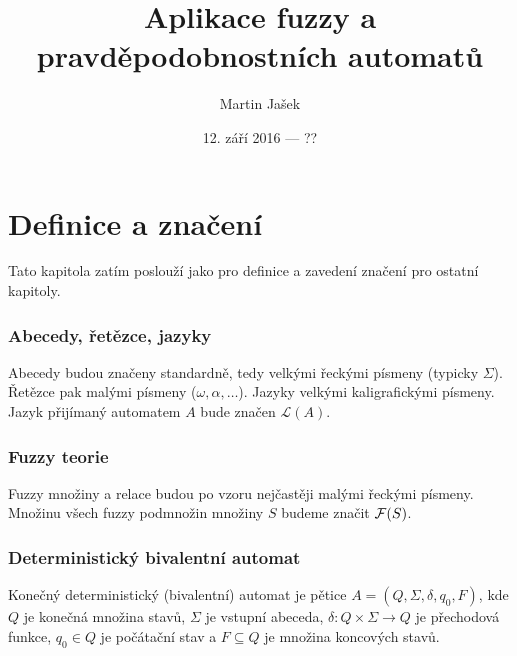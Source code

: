 \documentclass[a4paper,10pt]{article}
\title{Aplikace fuzzy a pravděpodobnostních automatů}
\author{Martin Jašek}
\date{12. září 2016 --- ??}
\begin{document}
\maketitle
\tableofcontents
\newpage

\section{Definice a značení}
Tato kapitola zatím poslouží jako  pro definice a zavedení značení pro ostatní kapitoly.

\subsubsection*{Abecedy, řetězce, jazyky}
Abecedy budou značeny standardně, tedy velkými řeckými písmeny (typicky $\Sigma$). Řetězce pak malými písmeny ($\omega, \alpha, \dots$). Jazyky velkými kaligrafickými písmeny. Jazyk přijímaný automatem $A$ bude značen $\mathcal{L}(A)$.

\subsubsection*{Fuzzy teorie}
Fuzzy množiny a relace budou po vzoru \cite{AstGonMenGar-FuzzAutEpsMovCmpFuzzMeasBtwStrs} nejčastěji malými řeckými písmeny. Množinu všech fuzzy podmnožin množiny $S$ budeme značit $\mathcal{F}(S)$.

\subsubsection*{Deterministický bivalentní automat}
\begin{definition}
 Konečný deterministický (bivalentní) automat je pětice $A = ( Q, \Sigma, \delta, q_0, F )$, kde $Q$ je konečná množina stavů, $\Sigma$ je vstupní abeceda, $\delta: Q \times \Sigma \rightarrow Q$ je přechodová funkce, $q_0 \in Q$ je počátační stav a $F \subseteq Q$ je množina koncových stavů.
\end{definition}
\end{document}
